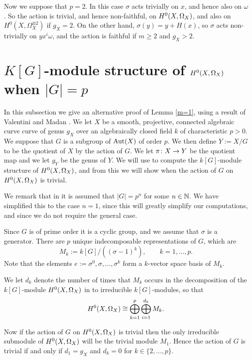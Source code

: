 Now we suppose that $p=2$.
In this case $\sigma$ acts trivially on $x$, and hence also on $\omega$.
So the action is trivial, and hence non-faithful, on ${H^0(X,\Omega_X)}$, and also on $H^0(X,\Omega_X^{\otimes 2})$ if $g_X = 2$.
On the other hand, $\sigma(y) = y + H(x)$, so $\sigma$ acts non-trivially on $yx^i \omega$, and the action is faithful if $m \geq 2$ and $g_X > 2$.



\section{$K[G]$-module structure of ${H^0(X,\Omega_X)}$ when $|G|=p$}

In this subsection we give an alternative proof of Lemma \ref{m=1}, using a result of Valentini and Madan \cite{valmadan}.
We let $X$ be a smooth, projective, connected algebraic curve curve of genus $g_X$ over an algebraically closed field $k$ of characteristic $p >0$.
We suppose that $G$ is a subgroup of $\operatorname{Aut}(X)$ of order $p$.
We then define $Y:= X/G$ to be the quotient of $X$ by the action of $G$.
We let $\pi \colon X \rightarrow Y$ be the quotient map and we let $g_Y$ be the genus of $Y$.
We will use \cite[Thm.\ 1]{valmadan} to compute the $k[G]$-module structure of ${H^0(X,\Omega_X)}$, and from this we will show when the action of $G$ on ${H^0(X,\Omega_X)}$ is trivial.

We remark that in \cite{valmadan} it is assumed that $|G|=p^n$ for some $n \in {\mathbb N}$.
We have simplified this to the case $n=1$, since this will greatly simplify our computations, and since we do not require the general case.

Since $G$ is of prime order it is a cyclic group, and we assume that $\sigma$ is a generator.
There are $p$ unique indecomposable representations of $G$, which are 
    \[
    M_k := k[G]/((\sigma - 1)^k), \qquad k = 1, \ldots, p.
    \]
Note that the elements $e:= \sigma^0, \sigma, \ldots, \sigma^k$ form a $k$-vector space basis of $M_k$.

We let $d_k$ denote the number of times that $M_k$ occurs in the decomposition of the $k[G]$-module ${H^0(X,\Omega_X)}$ in to irreducible $k[G]$-modules, so that
    \begin{equation}\label{equationdecompositionofhzero}
    {H^0(X,\Omega_X)} \cong \bigoplus_{k=1}^p \bigoplus_{i=1}^{d_k} M_k.
    \end{equation}

Now if the action of $G$ on ${H^0(X,\Omega_X)}$ is trivial then the only irreducible submodule of ${H^0(X,\Omega_X)}$ will be the trivial module $M_1$.
Hence the action of $G$ is trivial if and only if $d_1 = g_X$ and $d_k = 0$ for $k \in \{ 2, \ldots, p \}$.

